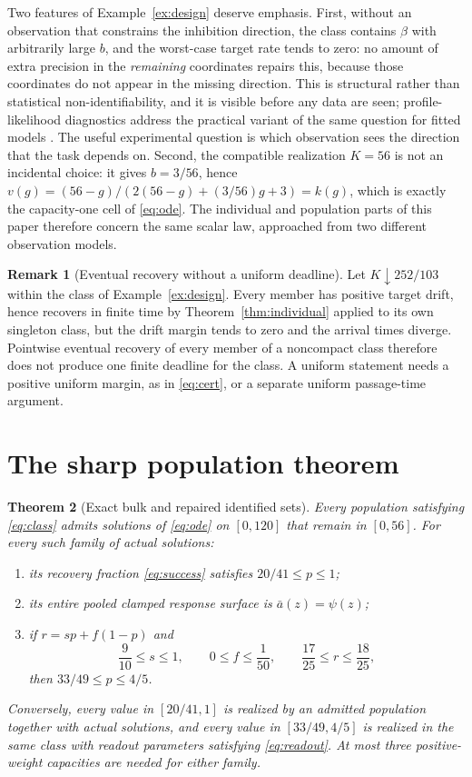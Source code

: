 \documentclass[11pt]{article}
\newtheorem{theorem}{Theorem}[section]
\theoremstyle{definition}
\newtheorem{remark}[theorem]{Remark}
\begin{document}
Two features of Example~\ref{ex:design} deserve emphasis. First, without an
observation that constrains the inhibition direction, the class contains
$\beta$ with arbitrarily large $b$, and the worst-case target rate tends to
zero: no amount of extra precision in the \emph{remaining} coordinates repairs
this, because those coordinates do not appear in the missing direction. This is
structural rather than statistical non-identifiability, and it is visible
before any data are seen; profile-likelihood diagnostics address the practical
variant of the same question for fitted models \cite{raue}. The useful
experimental question is which observation sees the direction that the task
depends on. Second, the compatible realization $K=56$ is not an
incidental choice: it gives $b=3/56$, hence
$v(g)=(56-g)/(2(56-g)+(3/56)g+3)=k(g)$, which is exactly the capacity-one cell
of \eqref{eq:ode}. The individual and population parts of this paper therefore
concern the same scalar law, approached from two different observation models.

\begin{remark}[Eventual recovery without a uniform deadline]\label{rem:nonuniform}
Let $K\downarrow252/103$ within the class of Example~\ref{ex:design}. Every
member has positive target drift, hence recovers in finite time by
Theorem~\ref{thm:individual} applied to its own singleton class, but the drift
margin tends to zero and the arrival times diverge. Pointwise eventual
recovery of every member of a noncompact class therefore does not produce one
finite deadline for the class. A uniform statement needs a positive uniform
margin, as in \eqref{eq:cert}, or a separate uniform passage-time argument.
\end{remark}

\section{The sharp population theorem}\label{sec:main}

\begin{theorem}[Exact bulk and repaired identified sets]\label{thm:main}
Every population satisfying \eqref{eq:class} admits solutions of
\eqref{eq:ode} on $[0,120]$ that remain in $[0,56]$. For every such family of
actual solutions:
\begin{enumerate}
\item its recovery fraction \eqref{eq:success} satisfies $20/41\le p\le1$;
\item its entire pooled clamped response surface is $\bar a(z)=\psi(z)$;
\item if $r=sp+f(1-p)$ and
\begin{equation}\label{eq:readout}
  \frac9{10}\le s\le1,\qquad 0\le f\le\frac1{50},\qquad
  \frac{17}{25}\le r\le\frac{18}{25},
\end{equation}
then $33/49\le p\le4/5$.
\end{enumerate}
Conversely, every value in $[20/41,1]$ is realized by an admitted population
together with actual solutions, and every value in $[33/49,4/5]$ is realized in
the same class with readout parameters satisfying \eqref{eq:readout}. At most
three positive-weight capacities are needed for either family.
\end{theorem}
\end{document}
